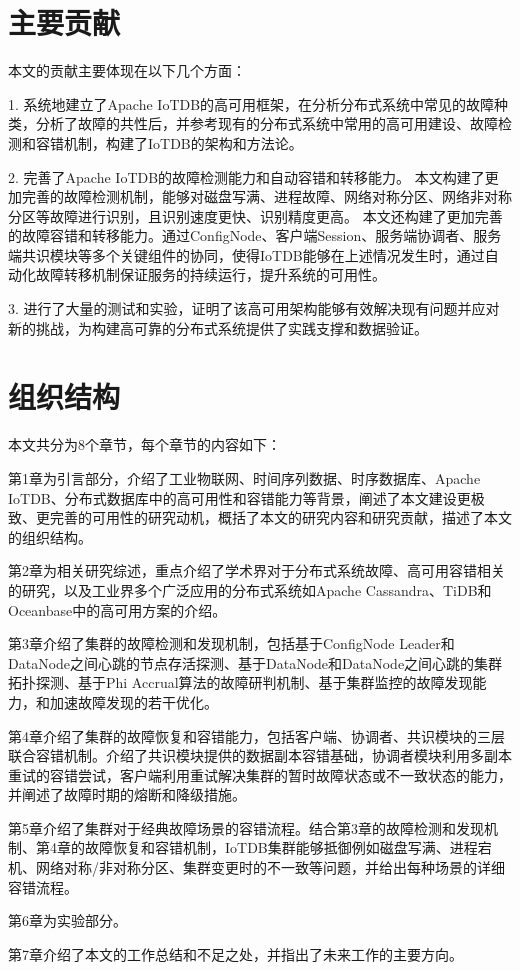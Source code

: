 \section{主要贡献}

本文的贡献主要体现在以下几个方面：

1. 系统地建立了Apache IoTDB的高可用框架，在分析分布式系统中常见的故障种类，分析了故障的共性后，并参考现有的分布式系统中常用的高可用建设、故障检测和容错机制，构建了IoTDB的架构和方法论。



2. 完善了Apache IoTDB的故障检测能力和自动容错和转移能力。
本文构建了更加完善的故障检测机制，能够对磁盘写满、进程故障、网络对称分区、网络非对称分区等故障进行识别，且识别速度更快、识别精度更高。
本文还构建了更加完善的故障容错和转移能力。通过ConfigNode、客户端Session、服务端协调者、服务端共识模块等多个关键组件的协同，使得IoTDB能够在上述情况发生时，通过自动化故障转移机制保证服务的持续运行，提升系统的可用性。


3. 进行了大量的测试和实验，证明了该高可用架构能够有效解决现有问题并应对新的挑战，为构建高可靠的分布式系统提供了实践支撑和数据验证。


\section{组织结构}
本文共分为8个章节，每个章节的内容如下：

第1章为引言部分，介绍了工业物联网、时间序列数据、时序数据库、Apache IoTDB、分布式数据库中的高可用性和容错能力等背景，阐述了本文建设更极致、更完善的可用性的研究动机，概括了本文的研究内容和研究贡献，描述了本文的组织结构。

第2章为相关研究综述，重点介绍了学术界对于分布式系统故障、高可用容错相关的研究，以及工业界多个广泛应用的分布式系统如Apache Cassandra、TiDB和Oceanbase中的高可用方案的介绍。

第3章介绍了集群的故障检测和发现机制，包括基于ConfigNode Leader和DataNode之间心跳的节点存活探测、基于DataNode和DataNode之间心跳的集群拓扑探测、基于Phi Accrual算法的故障研判机制、基于集群监控的故障发现能力，和加速故障发现的若干优化。

第4章介绍了集群的故障恢复和容错能力，包括客户端、协调者、共识模块的三层联合容错机制。介绍了共识模块提供的数据副本容错基础，协调者模块利用多副本重试的容错尝试，客户端利用重试解决集群的暂时故障状态或不一致状态的能力，并阐述了故障时期的熔断和降级措施。

第5章介绍了集群对于经典故障场景的容错流程。结合第3章的故障检测和发现机制、第4章的故障恢复和容错机制，IoTDB集群能够抵御例如磁盘写满、进程宕机、网络对称/非对称分区、集群变更时的不一致等问题，并给出每种场景的详细容错流程。

第6章为实验部分。

第7章介绍了本文的工作总结和不足之处，并指出了未来工作的主要方向。